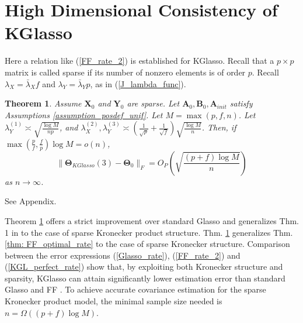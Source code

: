 \documentclass[journal,11pt,draftcls,onecolumn]{IEEEtran}
\def\bA{ {\mathbf{A}} }
\def\bB{ {\mathbf{B}} }
\def\bX{ {\mathbf{X}} }
\def\bY{ {\mathbf{Y}} }
\def\bTheta{ {\mathbf{\Theta}} }
\def\nn{{ \parallel   }}
\newtheorem{theorem}{Theorem}
\begin{document}
\section{High Dimensional Consistency of KGlasso} \label{sec: consistency}
Here a relation like (\ref{FF_rate_2}) is established for KGlasso. Recall that a $p\times p$ matrix is called sparse if its number of nonzero elements is of order $p$. Recall $\lambda_X=\bar{\lambda}_X f$ and $\lambda_Y=\bar{\lambda}_Y p$, as in (\ref{J_lambda_func}).


\begin{theorem} \label{thm: KGL_optimal_rate}
Assume $\bX_0$ and $\bY_0$ are sparse.
Let $\bA_0,\bB_0, \bA_{init}$ satisfy Assumptions \ref{assumption_posdef_unif}.  Let $M=\max(p,f,n)$.	Let $\lambda_Y^{(1)} \asymp \sqrt{\frac{\log M}{np}}$, and $\lambda_X^{(2)},\lambda_Y^{(3)} \asymp \left( \frac{1}{\sqrt{p}} + \frac{1}{\sqrt{f}} \right) \sqrt{\frac{\log M}{n}}$.
Then, if  $\max\left( \frac{p}{f}, \frac{f}{p}\right) \log M=o(n)$, %
	\begin{equation} \label{KGL_perfect_rate}
		\nn \bTheta_{KGlasso}(3) - \bTheta_0 \nn_F = O_P\left( \sqrt{\frac{(p+f) \log M}{n}} \right)
	\end{equation}
	as $n\to\infty$.
\end{theorem}
\begin{IEEEproof}
	See Appendix.
\end{IEEEproof}

Theorem \ref{thm: KGL_optimal_rate} offers a strict improvement over standard Glasso \cite{Rothman, ModelSel} and generalizes Thm. 1 in \cite{Rothman} to the case of sparse Kronecker product structure. Thm. \ref{thm: KGL_optimal_rate} generalizes Thm. \ref{thm: FF_optimal_rate} to the case of sparse Kronecker structure. %
Comparison between the error expressions (\ref{Glasso_rate}), (\ref{FF_rate_2}) and (\ref{KGL_perfect_rate}) show that, by exploiting both Kronecker structure and sparsity, KGlasso can attain significantly lower estimation error than standard  Glasso \cite{Rothman} and FF \cite{EstCovMatKron}. To achieve accurate covariance estimation for the sparse Kronecker product model, the minimal sample size needed is $n=\Omega((p+f)\log M)$.
\end{document}
